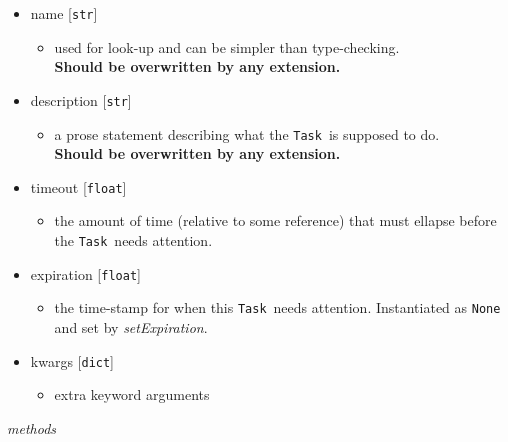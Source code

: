 \documentclass{article}
\newcommand{\Task}{\texttt{Task}}
\newcommand{\pythonfloat}{\texttt{float}}
\newcommand{\pythonstr}{\texttt{str}}
\newcommand{\pythondict}{\texttt{dict}}
\begin{document}
\begin{itemize}
    \item{name [\pythonstr]
        \begin{itemize}
            \item{used for look-up and can be simpler than type-checking. \\ \textbf{Should be overwritten by any extension.}}
        \end{itemize}
         }
    \item{description [\pythonstr]
        \begin{itemize}
            \item{a prose statement describing what the \Task~is supposed to do. \\ \textbf{Should be overwritten by any extension.}}
        \end{itemize}
         }
    \item{timeout [\pythonfloat]
        \begin{itemize}
            \item{the amount of time (relative to some reference) that must ellapse before the \Task~needs attention.}
        \end{itemize}
         }
    \item{expiration [\pythonfloat]
        \begin{itemize}
            \item{the time-stamp for when this \Task~needs attention. Instantiated as \texttt{None} and set by \textit{setExpiration}.}
        \end{itemize}
         }
    \item{kwargs [\pythondict]
        \begin{itemize}
            \item{extra keyword arguments}
        \end{itemize}
         }
\end{itemize}

\noindent
\textit{methods}
\end{document}
